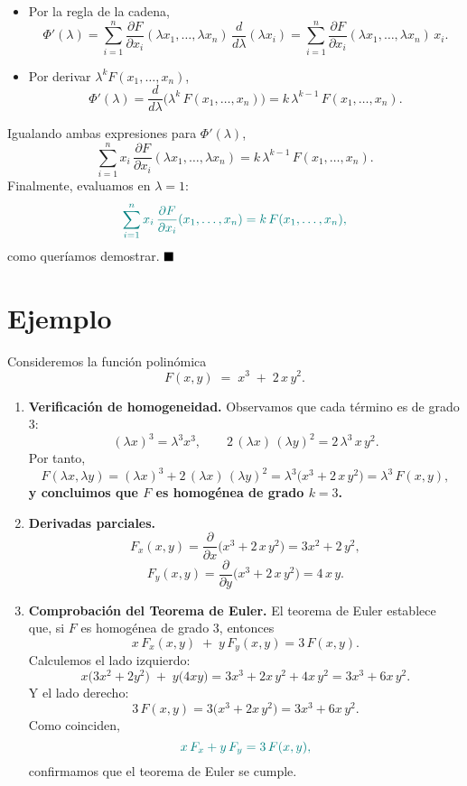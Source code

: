 \documentclass{article}
\begin{document}
\begin{itemize}
  \item Por la regla de la cadena,
  \[
  \Phi'(\lambda)
  = \sum_{i=1}^n \frac{\partial F}{\partial x_i}(\lambda x_1,\dots,\lambda x_n)
    \,\frac{d}{d\lambda}(\lambda x_i)
  = \sum_{i=1}^n \frac{\partial F}{\partial x_i}(\lambda x_1,\dots,\lambda x_n)\,x_i.
  \]
  \item Por derivar \(\lambda^k F(x_1,\dots,x_n)\),
  \[
  \Phi'(\lambda)
  = \frac{d}{d\lambda}\bigl(\lambda^k\,F(x_1,\dots,x_n)\bigr)
  = k\,\lambda^{k-1}\,F(x_1,\dots,x_n).
  \]
\end{itemize}

Igualando ambas expresiones para \(\Phi'(\lambda)\),
\[
\sum_{i=1}^n x_i \,\frac{\partial F}{\partial x_i}(\lambda x_1,\dots,\lambda x_n)
= k\,\lambda^{k-1}\,F(x_1,\dots,x_n).
\]
Finalmente, evaluamos en \(\lambda=1\):
\[\color{teal}
\sum_{i=1}^n x_i \,\frac{\partial F}{\partial x_i}(x_1,\dots,x_n)
= k\,F(x_1,\dots,x_n),
\]
como queríamos demostrar.  
\(\hfill\blacksquare\)


\section*{Ejemplo}

Consideremos la función polinómica
\[
F(x,y) \;=\; x^3 \;+\; 2\,x\,y^2.
\]
\begin{enumerate}
  \item \textbf{Verificación de homogeneidad.} Observamos que cada término es de grado 3:
  \[
    ( \lambda x)^3 = \lambda^3 x^3,
    \qquad
    2\,(\lambda x)\,(\lambda y)^2 = 2\,\lambda^3\,x\,y^2.
  \]
  Por tanto,
  \[
  F(\lambda x,\lambda y)
  = (\lambda x)^3 + 2\,(\lambda x)\,(\lambda y)^2
  = \lambda^3\bigl(x^3 + 2\,x\,y^2\bigr)
  = \lambda^3\,F(x,y),
  \]
\textbf{ \color{teal} y concluimos que \(F\) es homogénea de grado \(k=3\).
}
  \item \textbf{Derivadas parciales.}
  \[
    F_x(x,y)
    = \frac{\partial}{\partial x}\bigl(x^3 + 2\,x\,y^2\bigr)
    = 3x^2 + 2\,y^2,
  \]
  \[
    F_y(x,y)
    = \frac{\partial}{\partial y}\bigl(x^3 + 2\,x\,y^2\bigr)
    = 4\,x\,y.
  \]

  \item \textbf{Comprobación del Teorema de Euler.}  
  El teorema de Euler establece que, si \(F\) es homogénea de grado \(3\), entonces
  \[
    x\,F_x(x,y) \;+\; y\,F_y(x,y)
    = 3\,F(x,y).
  \]
  Calculemos el lado izquierdo:
  \[
    x\bigl(3x^2 + 2y^2\bigr) \;+\; y\bigl(4xy\bigr)
    = 3x^3 + 2x\,y^2 + 4x\,y^2
    = 3x^3 + 6x\,y^2.
  \]
  Y el lado derecho:
  \[
    3\,F(x,y)
    = 3\bigl(x^3 + 2x\,y^2\bigr)
    = 3x^3 + 6x\,y^2.
  \]
  Como coinciden,
  \[\color{teal}
    x\,F_x + y\,F_y = 3\,F(x,y),
  \]
  confirmamos que el teorema de Euler se cumple.  
\end{enumerate}
\end{document}
